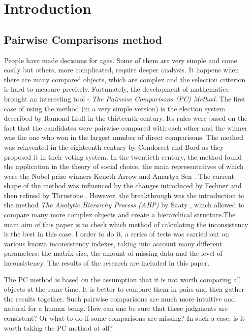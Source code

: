 \chapter{Introduction}
\label{cha:wprowadzenie}

\section{Pairwise Comparisons method}
\label{sec:metodaPorowan}
People have made decisions for ages. Some of them are very simple and come easily but others, more complicated, require deeper analysis. It happens when there are many compared objects, which are complex and the selection criterion is hard to measure precisely. Fortunately, the development of mathematics brought an interesting tool - \textit{The Pairwise Comparisons (PC) Method}. The first case of using the method (in a very simple version) is the election system described by Ramond Llull \cite{Colomer2013} in the thirteenth century. Its rules were based on the fact that the candidates were pairwise compared with each other and the winner was the one who won in the largest number of direct comparisons. The method was reinvented in the eighteenth century by Condorcet and Bord \cite{Kulakowski2016} as they proposed it in their voting system. In the twentieth century, the method found the application in the theory of social choice, the main representatives of which were the Nobel prize winners Keneth Arrow \cite{Arrow} and Amartya Sen \cite{Sen}. The current shape of the method was influenced by the changes introduced by Fechner \cite{Fechner1966} and then refined by {Thrustone} \cite{Thurstone1994}. However, the breakthrough was the introduction to the method \textit\textit{The Analytic Hierarchy Process (AHP)} by Saaty \cite{Saaty2008}, which allowed to compare many more complex objects and create a hierarchical structure.The main aim of this paper is to check which method of calculating the inconsistency is the best in this case. I order to do it, a series of tests was carried out on various known inconsistency indexes, taking into account many different parameters: the matrix size, the amount of missing data and the level of inconsistency. The results of the research are included in this paper.

The PC method is based on the assumption that it is not worth comparing all objects at the same time. It is better to compare them in pairs and then gather the results together. Such pairwise comparisons are much more intuitive and natural for a human being. How can one be sure that these judgments are consistent? Or what to do if some comparisons are missing? In such a case, is it worth taking the PC method at all?

